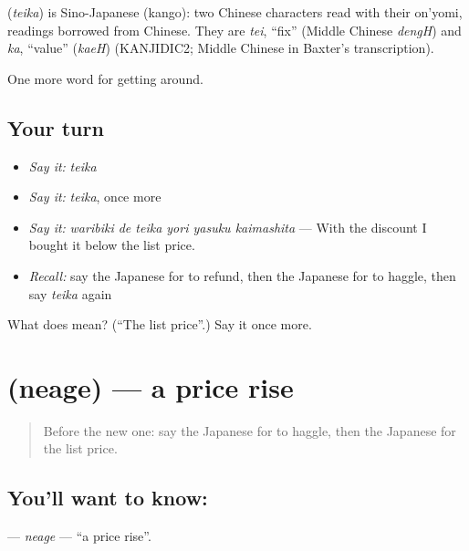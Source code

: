 \begin{cousinweb}
\textbf{} (\emph{teika}) is Sino-Japanese (kango): two Chinese characters read with their on'yomi, readings borrowed from Chinese. They are \emph{tei}, \textquotedblleft{}fix\textquotedblright{} (Middle Chinese \emph{dengH}) and \emph{ka}, \textquotedblleft{}value\textquotedblright{} (\emph{kaeH}) (KANJIDIC2; Middle Chinese in Baxter's transcription).
\end{cousinweb}

\begin{grammarlens}[title={What you've built}]
One more word for getting around.
\end{grammarlens}

\subsection*{Your turn}
\begin{itemize}
\raggedright
  \item \emph{Say it:} \emph{teika}
  \item \emph{Say it:} \emph{teika}, once more
  \item \emph{Say it:} \emph{waribiki de teika yori yasuku kaimashita} — With the discount I bought it below the list price.
  \item \emph{Recall:} say the Japanese for to refund, then the Japanese for to haggle, then say \emph{teika} again
\end{itemize}

\begin{tcolorbox}[breakable,colback=teal!4,colframe=teal!35!black,title={Before you move on}]
What does  mean? (\textquotedblleft{}The list price\textquotedblright{}.) Say it once more.
\end{tcolorbox}
\section[\texorpdfstring{\ja{ねあげ} (neage)}{ねあげ (neage)}]{ (neage) — a price rise}

\label{lesson:JA-C421-neage}



\begin{quote}
Before the new one: say the Japanese for to haggle, then the Japanese for the list price.
\end{quote}

\subsection*{You'll want to know: }
\textbf{} — \emph{neage} — \textquotedblleft{}a price rise\textquotedblright{}.

